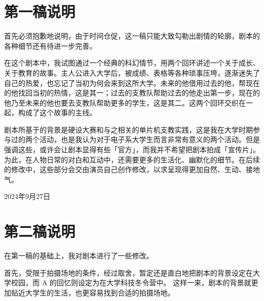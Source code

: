 \documentclass[10pt, a5paper, oneside]{memoir}
\begin{document}
\chapter*{第一稿说明}

首先必须抱歉地说明，由于时间仓促，这一稿只能大致勾勒出剧情的轮廓，剧本的各种细节还有待进一步完善。

在这个剧本中，我试图通过一个经典的科幻情节，用两个回环讲述一个关于成长、关于教育的故事。主人公进入大学后，被成绩、表格等各种琐事压垮，逐渐迷失了自己的热爱，也忘记了当初为何会来到这所大学。未来的他借用过去的他，帮现在的他找回当初的热情，这是其一；过去的支教队帮助过去的他走出第一步，现在的他乃至未来的他也要去支教队帮助更多的学生，这是其二。这两个回环交织在一起，构成了这个故事的主线。

剧本所基于的背景是硬设大赛和与之相关的单片机支教实践，这是我在大学时期参与过的两个活动，也是我认为对于电子系大学生而言非常有意义的两个活动。但是强调这些，或许会让剧本显得有些「官方」，而我并不希望把剧本拍成「宣传片」。为此，在人物日常的对白和互动中，还需要更多的生活化、幽默化的细节。在后续的修改中，这些部分会交由演员自己创作修改，以求呈现得更加自然、生动、接地气。

{\hfill\kai 2024年9月27日}




\clearpage

\chapter*{第二稿说明}

在第一稿的基础上，我对剧本进行了一些修改。

首先，受限于拍摄场地的条件，经过取舍，暂定还是直白地把剧本的背景设定在大学校园，而 A 的回忆则设定为在大学科技冬令营中。
这样一来，剧本的背景就更加贴近大学生的生活，也更容易找到合适的拍摄场地。
\end{document}
